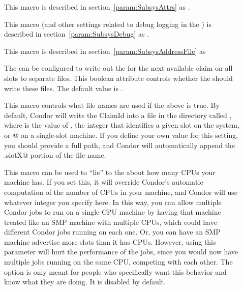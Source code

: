 \begin{description}
\item[] \label{param:StartdAttrs} This macro is
  described in section~\ref{param:SubsysAttrs} as
  .

\item[] \label{param:StartdDebug} This macro
  (and other settings related to debug logging in the ) is
  described in section~\ref{param:SubsysDebug} as
  .

\item[] \label{param:StartdAddressFile}
  This macro is described in
  section~\ref{param:SubsysAddressFile} as

\item[] \label{param:StartdShouldWriteClaimIdFile}
  The  can be configured
  to write out the  for the next available claim on all
  slots to separate files.
  This boolean attribute controls whether the  should
  write these files.
  The default value is .
  
\item[] \label{param:StartdClaimIdFile}
  This macro controls what file names are used if the above
   is true.  By
  default, Condor will write the ClaimId into a file in the
   directory called , where
  \verb@X@ is the value of , the integer that
  identifies a given slot on the system, or @ on a
  single-slot machine.
  If you define your own value for this setting, you should provide a
  full path, and Condor will automatically append the \verb@.slotX@
  portion of the file name.

\item[] \label{param:NumCpus}
  This macro can be used to ``lie'' to the  about how many CPUs
  your machine has.
  If you set this, it will override Condor's automatic computation of
  the number of CPUs in your machine, and Condor will use whatever
  integer you specify here. 
  In this way, you can allow multiple Condor jobs to run on a
  single-CPU machine by having that machine treated like an SMP
  machine with multiple CPUs, which could have different Condor jobs
  running on each one.
  Or, you can have an SMP machine advertise more slots than
  it has CPUs.
  However, using this parameter will hurt the performance of the jobs,
  since you would now have multiple jobs running on the same CPU,
  competing with each other.
  The option is only meant for people who specifically want this
  behavior and know what they are doing.  
  It is disabled by default.


\end{description}
